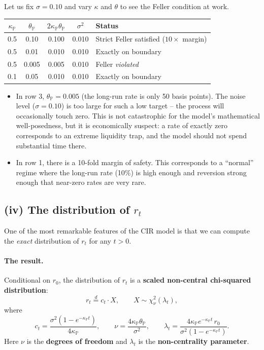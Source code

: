 \documentclass[11pt]{article}
\newcommand{\PP}{\mathbb{P}}
\begin{document}
Let us fix $\sigma = 0.10$ and vary $\kappa$ and $\theta$ to see the Feller
condition at work.

\begin{center}
\begin{tabular}{ccccl}
\toprule
$\kappa_\PP$ & $\theta_\PP$ & $2\kappa_\PP\theta_\PP$ & $\sigma^2$ & Status\\
\midrule
0.5 & 0.10 & 0.100 & 0.010 & Strict Feller satisfied ($10\times$ margin) \\
0.5 & 0.01 & 0.010 & 0.010 & Exactly on boundary \\
0.5 & 0.005 & 0.005 & 0.010 & Feller \emph{violated} \\
0.1 & 0.05 & 0.010 & 0.010 & Exactly on boundary \\
\bottomrule
\end{tabular}
\end{center}

\begin{itemize}
  \item In row 3, $\theta_\PP = 0.005$ (the long-run rate is only 50 basis
  points).  The noise level ($\sigma=0.10$) is too large for such a
  low target -- the process will occasionally touch zero.  This is not
  catastrophic for the model's mathematical well-posedness, but it is
  economically suspect: a rate of exactly zero corresponds to an extreme
  liquidity trap, and the model should not spend substantial time there.
  \item In row 1, there is a 10-fold margin of safety.  This corresponds to
  a ``normal'' regime where the long-run rate (10\%) is high enough and
  reversion strong enough that near-zero rates are very rare.
\end{itemize}

\subsection{(iv) The distribution of $r_t$}

One of the most remarkable features of the CIR model is that we can compute
the \emph{exact} distribution of $r_t$ for any $t>0$.

\paragraph{The result.}  Conditional on $r_0$, the distribution of
$r_t$ is a \textbf{scaled non-central chi-squared distribution}:
\[
r_t \overset{d}{=} c_t \cdot X,
\qquad
X \sim \chi^2_\nu(\lambda_t),
\]
where
\[
c_t = \frac{\sigma^2(1-e^{-\kappa_\PP t})}{4\kappa_\PP},
\qquad
\nu = \frac{4\kappa_\PP\theta_\PP}{\sigma^2},
\qquad
\lambda_t = \frac{4\kappa_\PP e^{-\kappa_\PP t}\,r_0}{\sigma^2(1-e^{-\kappa_\PP t})}.
\]
Here $\nu$ is the \textbf{degrees of freedom} and $\lambda_t$ is the
\textbf{non-centrality parameter}.
\end{document}
